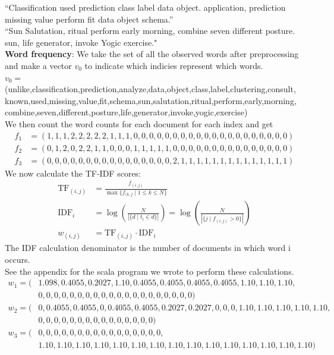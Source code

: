 \documentclass{article}
\theoremstyle{remark}
\begin{document}
	\noindent“Classification  used  prediction  class label data object. application, prediction  missing value perform fit data object schema.”\\
	
	\noindent“Sun Salutation, ritual perform early morning, combine seven different posture. sun,  life generator, invoke Yogic exercise."\\
	
	\noindent\textbf{Word frequency}: We take the set of all the observed words after preprocessing and make a vector $v_0$ to indicate which indicies represent which words.
	\\$v_0 = $(unlike,classification,prediction,analyze,data,object,class,label,clustering,consult,\\known,used,missing,value,fit,schema,sun,salutation,ritual,perform,early,morning,\\combine,seven,different,posture,life,generator,invoke,yogic,exercise)\\
	We then count the word counts for each document for each index and get
	\begin{align*}
	f_1 &= (1,1,1,2,2,2,2,2,1,1,1,0,0,0,0,0,0,0,0,0,0,0,0,0,0,0,0,0,0,0,0)
	\\f_2 &= (0,1,2,0,2,2,1,1,0,0,0,1,1,1,1,1,0,0,0,0,0,0,0,0,0,0,0,0,0,0,0)
	\\f_3 &= (0,0,0,0,0,0,0,0,0,0,0,0,0,0,0,0,2,1,1,1,1,1,1,1,1,1,1,1,1,1,1)
	\end{align*}
	We now calculate the TF-IDF scores:
	\begin{align*}
	\text{TF}_{(i,j)} &= \frac{f_{(i,j)}}{\max\{ f_{(k,j}\mid 1\leq k \leq N \}}\\
	\text{IDF}_i &= \log\left(\frac{N}{|\{ d \mid t_i \in d \}|}\right) = \log\left(\frac{N}{|\{ j \mid f_{(i,j)}> 0\}|}\right) \\
	w_{(i,j)} &= \text{TF}_{(i,j)}\cdot \text{IDF}_i
	\end{align*}
	The IDF calculation denominator is the number of documents in which word i occurs.\\
	See the appendix for the scala program we wrote to perform these calculations.
	\begin{align*}
	w_1= (&1.098, 0.4055, 0.2027, 1.10, 0.4055, 0.4055, 0.4055, 0.4055, 1.10, 1.10, 1.10, \\&0, 0, 0, 0, 0, 0, 0, 0, 0, 0, 0, 0, 0, 0, 0, 0, 0, 0, 0, 0)\\
	w_2 =(&0, 0.4055, 0.4055, 0, 0.4055, 0.4055, 0.2027, 0.2027, 0, 0, 0, 1.10, 1.10, 1.10, 1.10, 1.10,
	\\&0, 0, 0, 0, 0, 0, 0, 0, 0, 0, 0, 0, 0, 0, 0)\\
	w_3=(&0, 0, 0, 0, 0, 0, 0, 0, 0, 0, 0, 0, 0, 0, 0, 0,
	\\&1.10, 1.10, 1.10, 1.10, 1.10, 1.10, 1.10, 1.10, 1.10, 1.10, 1.10, 1.10, 1.10, 1.10, 1.10)
	\end{align*}
	
\end{document}
